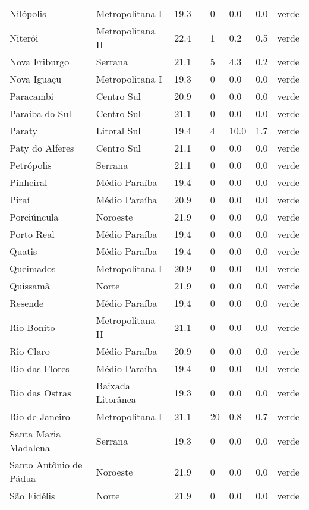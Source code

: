 \begin{longtable}{l|lllllll}
  Nilópolis & Metropolitana I & 19.3 &  & 0 & 0.0 & 0.0 & verde \\ 
  Niterói & Metropolitana II & 22.4 &  & 1 & 0.2 & 0.5 & verde \\ 
  Nova Friburgo & Serrana & 21.1 &  & 5 & 4.3 & 0.2 & verde \\ 
  Nova Iguaçu & Metropolitana I & 19.3 &  & 0 & 0.0 & 0.0 & verde \\ 
  Paracambi & Centro Sul & 20.9 &  & 0 & 0.0 & 0.0 & verde \\ 
  Paraíba do Sul & Centro Sul & 21.1 &  & 0 & 0.0 & 0.0 & verde \\ 
  Paraty & Litoral Sul & 19.4 &  & 4 & 10.0 & 1.7 & verde \\ 
  Paty do Alferes & Centro Sul & 21.1 &  & 0 & 0.0 & 0.0 & verde \\ 
  Petrópolis & Serrana & 21.1 &  & 0 & 0.0 & 0.0 & verde \\ 
  Pinheiral & Médio Paraíba & 19.4 &  & 0 & 0.0 & 0.0 & verde \\ 
  Piraí & Médio Paraíba & 20.9 &  & 0 & 0.0 & 0.0 & verde \\ 
  Porciúncula & Noroeste & 21.9 &  & 0 & 0.0 & 0.0 & verde \\ 
  Porto Real & Médio Paraíba & 19.4 &  & 0 & 0.0 & 0.0 & verde \\ 
  Quatis & Médio Paraíba & 19.4 &  & 0 & 0.0 & 0.0 & verde \\ 
  Queimados & Metropolitana I & 20.9 &  & 0 & 0.0 & 0.0 & verde \\ 
  Quissamã & Norte & 21.9 &  & 0 & 0.0 & 0.0 & verde \\ 
  Resende & Médio Paraíba & 19.4 &  & 0 & 0.0 & 0.0 & verde \\ 
  Rio Bonito & Metropolitana II & 21.1 &  & 0 & 0.0 & 0.0 & verde \\ 
  Rio Claro & Médio Paraíba & 20.9 &  & 0 & 0.0 & 0.0 & verde \\ 
  Rio das Flores & Médio Paraíba & 19.4 &  & 0 & 0.0 & 0.0 & verde \\ 
  Rio das Ostras & Baixada Litorânea & 19.3 &  & 0 & 0.0 & 0.0 & verde \\ 
  Rio de Janeiro & Metropolitana I & 21.1 &  & 20 & 0.8 & 0.7 & verde \\ 
  Santa Maria Madalena & Serrana & 19.3 &  & 0 & 0.0 & 0.0 & verde \\ 
  Santo Antônio de Pádua & Noroeste & 21.9 &  & 0 & 0.0 & 0.0 & verde \\ 
  São Fidélis & Norte & 21.9 &  & 0 & 0.0 & 0.0 & verde \\ 

\end{longtable}
